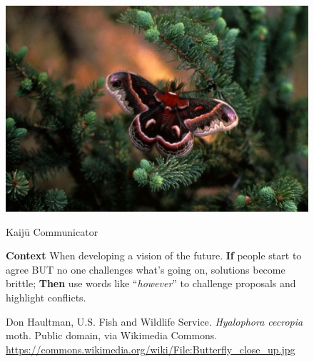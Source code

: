 \documentclass{article}
\begin{document}
\pagestyle{empty}
\thispagestyle{empty}
\pagecolor{deepmagenta!30}

\begin{figure}[h]
\begin{adjustbox}{minipage=[c]{\textwidth-10mm},margin= 5mm 30mm 5mm 30mm, frame=1pt, bgcolor=almond,env=center}%
\begin{center}
 \includegraphics[width=.7\paperwidth]{Butterfly_close_up.jpg}
\end{center}

\begin{center}
\begin{minipage}[t]{0.7\paperwidth}

\medskip
{\huge Kaijū Communicator}
\bigskip

\Large\raggedright
\textbf{Context} When developing a vision of the future.\newline
\textbf{If} people start to agree BUT no one challenges what’s going on, solutions become brittle;\newline
\textbf{Then} use words like “\emph{however}” to challenge proposals and highlight conflicts.
\end{minipage}
\end{center}
\caption*{Don Haultman, U.S. Fish and Wildlife Service. \emph{Hyalophora cecropia} moth. Public domain, via Wikimedia Commons.\newline
\url{https://commons.wikimedia.org/wiki/File:Butterfly_close_up.jpg}}
\end{adjustbox}
\end{figure}
\end{document}
